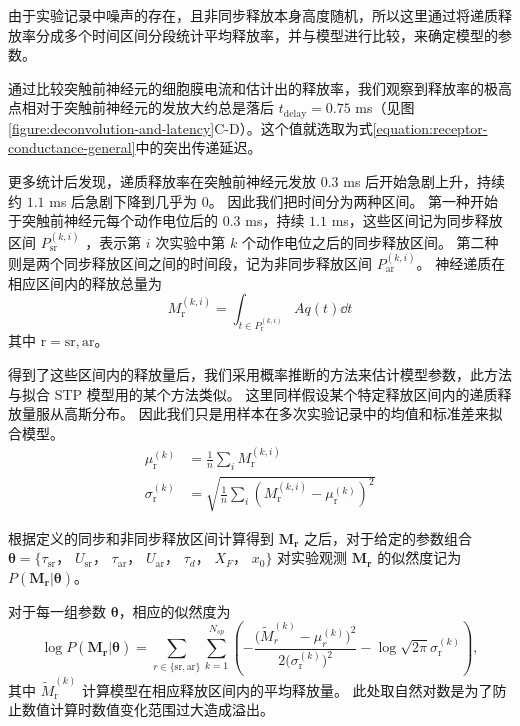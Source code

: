 由于实验记录中噪声的存在，且非同步释放本身高度随机，所以这里通过将递质释放率分成多个时间区间分段统计平均释放率，并与模型进行比较，来确定模型的参数。

通过比较突触前神经元的细胞膜电流和估计出的释放率，我们观察到释放率的极高点相对于突触前神经元的发放大约总是落后 $t_\text{delay} = 0.75$ ms（见图\ref{figure:deconvolution-and-latency}C-D）。这个值就选取为式\ref{equation:receptor-conductance-general}中的突出传递延迟。

更多统计后发现，递质释放率在突触前神经元发放 $0.3$ ms 后开始急剧上升，持续约 $1.1$ ms 后急剧下降到几乎为 $0$。
因此我们把时间分为两种区间。
第一种开始于突触前神经元每个动作电位后的 $0.3$ ms，持续 $1.1$ ms，这些区间记为同步释放区间 $P_\text{sr}^{(k,i)}$ ，表示第 $i$ 次实验中第 $k$ 个动作电位之后的同步释放区间。
第二种则是两个同步释放区间之间的时间段，记为非同步释放区间 $P_\text{ar}^{(k,i)}$。
神经递质在相应区间内的释放总量为
\begin{equation}
M_\text{r}^{(k,i)} = \int_{t \in P_\text{r}^{(k,i)}} Aq(t)\dd{t}
\end{equation}
其中 $\text{r} = \text{sr}, \text{ar}$。

得到了这些区间内的释放量后，我们采用概率推断的方法来估计模型参数，此方法与拟合 STP 模型用的某个方法类似\cite{Costa2013}。
这里同样假设某个特定释放区间内的递质释放量服从高斯分布。
因此我们只是用样本在多次实验记录中的均值和标准差来拟合模型。
\begin{align}
\mu_\text{r}^{(k)} &= \frac{1}{n} \sum_i M_\text{r}^{(k,i)} \\
\sigma_\text{r}^{(k)} &= \sqrt{\frac{1}{n}\sum_i\left( M_\text{r}^{(k,i)} - \mu_\text{r}^{(k)} \right)^2}
\label{equation:statistics-for-fitting}
\end{align}

根据定义的同步和非同步释放区间计算得到 $\bm{M_\text{r}}$ 之后，对于给定的参数组合 $\bm{\theta} = \{\tau_\text{sr}$，
$U_\text{sr}$， $\tau_\text{ar}$， $U_\text{ar}$， $\tau_d$， $X_F$， $x_0 \}$ 对实验观测 $\bm{M_\text{r}}$ 的似然度记为 $P\left(\bm{M_\text{r}}\left|\bm{\theta}\right.\right)$。

对于每一组参数 $\bm{\theta}$，相应的似然度为
\begin{equation}
 \log P\left(\bm{M_\text{r}}\left|\bm{\theta}\right.\right) = \sum_{r \in
    \{\text{sr}, \text{ar}\}}
  \sum_{k=1}^{N_{sp}} \left(-\frac{\big(\tilde{M}_{r}^{(k)}-\mu_{r}^{(k)}\big)^2}{2\big(\sigma_\text{r}^{(k)}\big)^2}
- \log\sqrt{2\pi}\sigma_\text{r}^{(k)} \right),
\label{equation:probabilistic-inference-log}
\end{equation}
其中 $\tilde{M}_\text{r}^{(k)}$ 计算模型在相应释放区间内的平均释放量。
此处取自然对数是为了防止数值计算时数值变化范围过大造成溢出。

